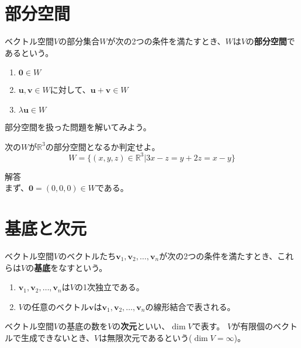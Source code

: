 \documentclass{jlreq}
\begin{document}
\section{部分空間}
\begin{definitionbox}[部分空間]
  ベクトル空間$V$の部分集合$W$が次の2つの条件を満たすとき、$W$は$V$の\textbf{部分空間}であるという。

  \begin{enumerate}
    \item $\boldsymbol{0} \in W$
    \item $\boldsymbol{u}, \boldsymbol{v} \in W$に対して、$\boldsymbol{u} + \boldsymbol{v} \in W$
    \item $\lambda \boldsymbol{u} \in W$
  \end{enumerate}
\end{definitionbox}

部分空間を扱った問題を解いてみよう。

\begin{problem}
  次の$W$が$\mathbb{R}^3$の部分空間となるか判定せよ。
  \begin{equation*}
    W = \{ (x, y, z) \in \mathbb{R}^3 | 3x - z = y + 2z = x - y \}
  \end{equation*}

  \dotfill

  解答 \\
  まず、$\boldsymbol{0} = (0, 0, 0) \in W$である。
\end{problem}

\section{基底と次元}
\begin{definitionbox}[基底]
  ベクトル空間$V$のベクトルたち$\boldsymbol{v}_1, \boldsymbol{v}_2, \ldots, \boldsymbol{v}_n$が次の2つの条件を満たすとき、これらは$V$の\textbf{基底}をなすという。

  \begin{enumerate}
    \item $\boldsymbol{v}_1, \boldsymbol{v}_2, \ldots, \boldsymbol{v}_n$は$V$の1次独立である。
    \item $V$の任意のベクトル$\boldsymbol{v}$は$\boldsymbol{v}_1, \boldsymbol{v}_2, \ldots, \boldsymbol{v}_n$の線形結合で表される。
  \end{enumerate}
\end{definitionbox}

\begin{definitionbox}[次元]
  ベクトル空間$V$の基底の数を$V$の\textbf{次元}といい、$\dim V$で表す。
  $V$が有限個のベクトルで生成できないとき、$V$は無限次元であるという($\dim V = \infty$)。
\end{definitionbox}
\end{document}
